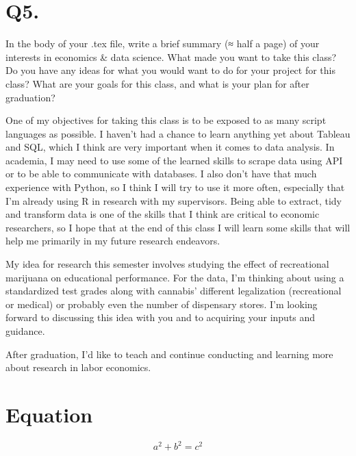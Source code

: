 \documentclass[12pt]{article}
\theoremstyle{definition}
\begin{document}
\section*{Q5.}
 In the body of your .tex file, write a brief summary (≈ half a page) of your interests in economics & data science. What made you want to take this class? Do you have any ideas for what you would want to do for your project for this class? What are your goals for this class, and what is your plan for after graduation? 


One of my objectives for taking this class is to be exposed to as many script languages as possible. I haven't had a chance to learn anything yet about Tableau and SQL, which I think are very important when it comes to data analysis. In academia, I may need to use some of the learned skills to scrape data using API or to be able to communicate with databases. I also don't have that much experience with Python, so I think I will try to use it more often, especially that I'm already using R in research with my supervisors. 
Being able to extract, tidy and transform data is one of the skills that I think are critical to economic researchers, so I hope that at the end of this class I will learn some skills that will help me primarily in my future research endeavors.

My idea for research this semester involves studying the effect of recreational marijuana on educational performance. For the data, I'm thinking about using a standardized test grades along with cannabis' different legalization (recreational or medical) or probably even the number of dispensary stores. I'm looking forward to discussing this idea with you and to acquiring your inputs and guidance. 

After graduation, I'd like to teach and continue conducting  and  learning more about research in labor economics. 

\section*{Equation}

\[
a^2 + b^2 = c^2
\]
\end{document}
